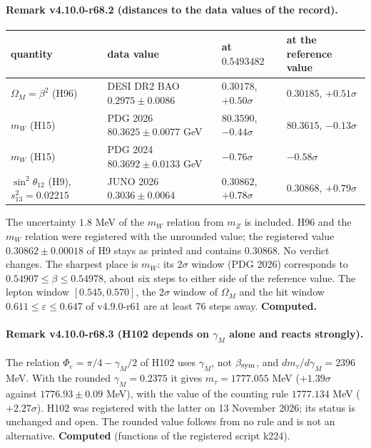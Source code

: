 \paragraph{Remark v4.10.0-r68.2 (distances to the data values of the record).}
\begin{center}
\small
\begin{tabular}{@{}>{\raggedright\arraybackslash}p{}>{\raggedright\arraybackslash}p{}>{\raggedright\arraybackslash}p{}>{\raggedright\arraybackslash}p{}@{}}
\toprule
quantity & data value & at \(0.5493482\) & at the reference value\\
\midrule
\(\Omega_M=\beta^2\) (H96) & DESI DR2 BAO \(0.2975\pm0.0086\) & \(0.30178\), \(+0.50\sigma\) & \(0.30185\), \(+0.51\sigma\)\\
\(m_W\) (H15) & PDG 2026 \(80.3625\pm0.0077\) GeV & \(80.3590\), \(-0.44\sigma\) & \(80.3615\), \(-0.13\sigma\)\\
\(m_W\) (H15) & PDG 2024 \(80.3692\pm0.0133\) GeV & \(-0.76\sigma\) & \(-0.58\sigma\)\\
\(\sin^2\theta_{12}\) (H9), \(s_{13}^2=0.02215\) & JUNO 2026 \(0.3036\pm0.0064\) & \(0.30862\), \(+0.78\sigma\) & \(0.30868\), \(+0.79\sigma\)\\
\bottomrule
\end{tabular}
\end{center}
The uncertainty \(1.8\) MeV of the \(m_W\) relation from \(m_Z\) is included.  H96 and the \(m_W\) relation were registered with the unrounded
value; the registered value \(0.30862\pm0.00018\) of H9 stays as printed and contains \(0.30868\).  No verdict changes.  The sharpest place is
\(m_W\): its \(2\sigma\) window (PDG 2026) corresponds to \(0.54907\le\beta\le0.54978\), about six steps to either side of the reference value.
The lepton window \([0.545,0.570]\), the \(2\sigma\) window of \(\Omega_M\) and the hit window \(0.611\le\varepsilon\le0.647\) of v4.9.0-r61
are at least \(76\) steps away.  \textbf{Computed.}

\paragraph{Remark v4.10.0-r68.3 (H102 depends on \(\gamma_M\) alone and reacts strongly).}
The relation \(\Phi_e=\pi/4-\gamma_M/2\) of H102 uses \(\gamma_M\), not \(\beta_{\rm sym}\), and \(dm_\tau/d\gamma_M=2396\) MeV.  With the
rounded \(\gamma_M=0.2375\) it gives \(m_\tau=1777.055\) MeV (\(+1.39\sigma\) against \(1776.93\pm0.09\) MeV), with the value of the counting
rule \(1777.134\) MeV (\(+2.27\sigma\)).  H102 was registered with the latter on 13 November 2026; its status is unchanged and open.  The
rounded value follows from no rule and is not an alternative.  \textbf{Computed} (functions of the registered script k224).

